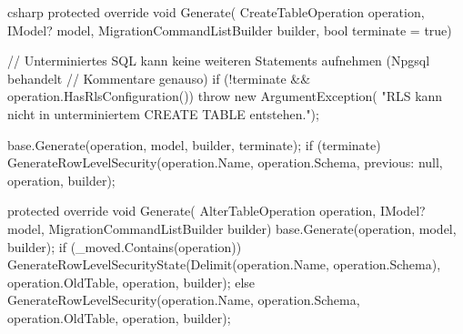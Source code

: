 \begin{sourcecode}{csharp}
protected override void Generate(
    CreateTableOperation operation, IModel? model,
    MigrationCommandListBuilder builder, bool terminate = true)
{
    // Unterminiertes SQL kann keine weiteren Statements aufnehmen (Npgsql behandelt
    // Kommentare genauso)
    if (!terminate && operation.HasRlsConfiguration())
        throw new ArgumentException(
            "RLS kann nicht in unterminiertem CREATE TABLE entstehen.");

    base.Generate(operation, model, builder, terminate);
    if (terminate)
        GenerateRowLevelSecurity(operation.Name, operation.Schema, previous: null,
            operation, builder);
}

protected override void Generate(
    AlterTableOperation operation, IModel? model, MigrationCommandListBuilder builder)
{
    base.Generate(operation, model, builder);
    if (_moved.Contains(operation))
        GenerateRowLevelSecurityState(Delimit(operation.Name, operation.Schema),
            operation.OldTable, operation, builder);
    else
        GenerateRowLevelSecurity(operation.Name, operation.Schema, operation.OldTable,
            operation, builder);
}
\end{sourcecode}

